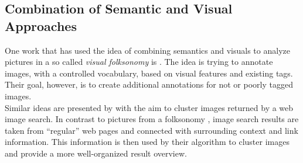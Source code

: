 \subsection{Combination of Semantic and Visual Approaches}

One work that has used the idea of combining semantics and visuals to analyze pictures in a so called \emph{visual folksonomy} is \cite{Lindstaedt2009}. The idea is trying to annotate images, with a controlled vocabulary, based on visual features and existing tags. Their goal, however, is to create additional annotations for not or poorly tagged images. \\
Similar ideas are presented by \cite{cai2004hierarchical} with the aim to cluster images returned by a web image search. In contrast to pictures from a folksonomy , image search results are taken from ``regular'' web pages and connected with surrounding context and link information. This information is then used by their algorithm to cluster images and provide a more well-organized result overview.
